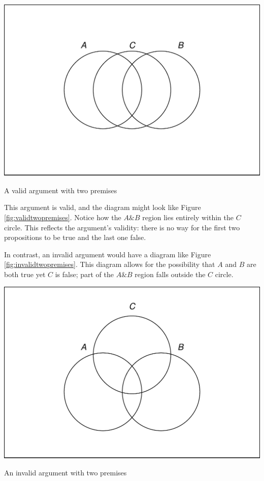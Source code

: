 \documentclass[justified]{tufte-book}
\renewcommand{\wedge}{\mathbin{\&}}
\theoremstyle{definition}
\theoremstyle{definition}
\theoremstyle{definition}
\theoremstyle{remark}
\begin{document}
\begin{marginfigure}
\includegraphics{_main_files/figure-latex/validtwopremises-1} \caption[A valid argument with two premises]{A valid argument with two premises}\label{fig:validtwopremises}
\end{marginfigure}

This argument is valid, and the diagram might look like Figure \ref{fig:validtwopremises}. Notice how the \(A \wedge B\) region lies entirely within the \(C\) circle. This reflects the argument's validity: there is no way for the first two propositions to be true and the last one false.

In contrast, an invalid argument would have a diagram like Figure \ref{fig:invalidtwopremises}. This diagram allows for the possibility that \(A\) and \(B\) are both true yet \(C\) is false; part of the \(A \wedge B\) region falls outside the \(C\) circle.

\begin{marginfigure}
\includegraphics{_main_files/figure-latex/invalidtwopremises-1} \caption[An invalid argument with two premises]{An invalid argument with two premises}\label{fig:invalidtwopremises}
\end{marginfigure}
\end{document}
